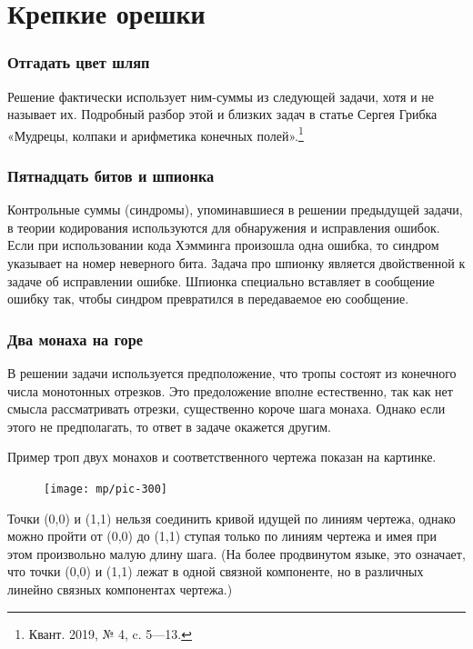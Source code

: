 \documentclass[twoside]{book}
\begin{document}
\section{Крепкие орешки}

\subsubsection*{Отгадать цвет шляп}
Решение фактически использует ним-суммы из следующей задачи, хотя и не называет их.
Подробный разбор этой и близких задач в статье Сергея Грибка «Мудрецы, колпаки и арифметика конечных полей».\footnote{Квант. 2019, № 4, c. 5—13.}

\subsubsection{Пятнадцать битов и шпионка}
Контрольные суммы (синдромы), упоминавшиеся  в решении предыдущей задачи, в теории кодирования используются для обнаружения и исправления ошибок.
Если при использовании кода Хэмминга произошла одна ошибка, то синдром указывает на номер неверного бита.
Задача про шпионку является двойственной к задаче об исправлении ошибке.
Шпионка специально вставляет в сообщение ошибку так, чтобы синдром превратился в передаваемое ею сообщение.

\subsubsection{Два монаха на горе}
В решении задачи используется предположение, что тропы состоят из конечного числа монотонных отрезков.
Это предоложение вполне естественно, так как нет смысла рассматривать отрезки, существенно короче шага монаха.
Однако если этого не предполагать, то ответ в задаче окажется другим.

Пример троп двух монахов и соответственного чертежа  показан на картинке.
\begin{figure}[ht!]
\vskip-0mm
\centering
\texttt{[image: mp/pic-300]}
\end{figure}
Точки (0,0) и (1,1) нельзя соединить кривой идущей по линиям чертежа, 
однако можно пройти от (0,0) до (1,1) ступая только по линиям чертежа и имея при этом произвольно малую длину шага.
(На более продвинутом языке, это означает, что точки (0,0) и (1,1) лежат в одной связной компоненте, но в различных линейно связных компонентах чертежа.)
\end{document}
